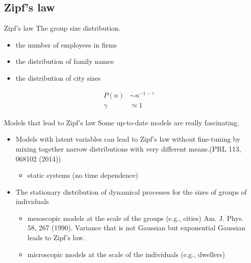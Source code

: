 \documentclass{beamer}
\begin{document}
\subsection{Zipf's law}
\begin{frame}{Zipf's law}
  The group size distribution.
  \begin{itemize}
    \item the number of employees in firms
    \item the distribution of family names
    \item the distribution of city sizes
    
  \end{itemize}

  \begin{align}
    P(n)&\sim n^{-1-\gamma}\\
    \gamma&\simeq 1
  \end{align}
  
\end{frame}

\begin{frame}{Models that lead to Zipf's law}
Some up-to-date models are really fascinating.
  \begin{itemize}
    \item Models with latent variables can lead to Zipf's law without fine-tuning by mixing together narrow distributions with very different means.(PRL 113, 068102 (2014))
    \begin{itemize}
      \item static systems (no time dependence)
    \end{itemize}
    \item The stationary distribution of dynamical processes for the sizes of groups of individuals
    \begin{itemize}
      \item mesoscopic models at the scale of the groups (e.g., cities) Am. J. Phys. 58, 267 (1990). Variance that is not Gaussian but exponential Gaussian leads to Zipf's law.
      \item microscopic models at the scale of the individuals (e.g., dwellers)
    \end{itemize}
  \end{itemize}
  
\end{frame}
\end{document}
